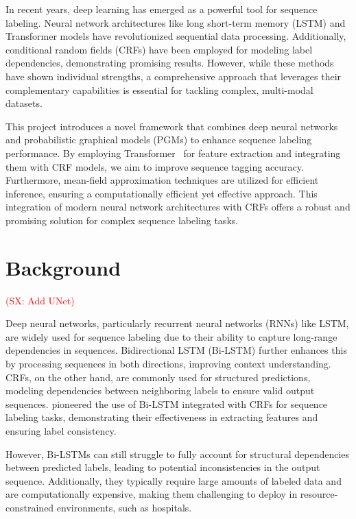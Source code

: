 \documentclass[conference]{IEEEtran}
\newcommand{\sx}[1]{\textcolor{red}{(SX: #1)}}
\begin{document}
In recent years, deep learning has emerged as a powerful tool for sequence
labeling. Neural network architectures like long short-term memory (LSTM) and
Transformer models have revolutionized sequential data processing.
Additionally, conditional random fields (CRFs) have been employed for modeling
label dependencies, demonstrating promising results.
However, while these methods have shown individual strengths, a comprehensive
approach that leverages their complementary capabilities is essential for
tackling complex, multi-modal datasets.


This project introduces a novel framework that combines deep neural networks
and probabilistic graphical models (PGMs) to enhance sequence labeling
performance. By employing Transformer~\citep{vaswani2017attention} for feature
extraction and integrating them with CRF models,
we aim to improve sequence tagging accuracy. Furthermore, mean-field
approximation techniques are utilized for efficient inference, ensuring a
computationally efficient yet effective approach.
This integration of modern neural network architectures with CRFs offers
a robust and promising solution for complex sequence labeling tasks.


\section{Background}

\sx{Add UNet}

Deep neural networks, particularly recurrent neural networks (RNNs) like LSTM,
are widely used for sequence labeling due to their ability to capture
long-range dependencies in sequences. Bidirectional LSTM (Bi-LSTM) further
enhances this by processing sequences in both directions, improving context
understanding.
CRFs, on the other hand, are commonly used for structured predictions,
modeling dependencies between neighboring labels to ensure valid output
sequences.
\citet{huang2015bidirectional} pioneered the use of Bi-LSTM integrated with
CRFs for sequence labeling tasks, demonstrating their effectiveness in
extracting features and ensuring label consistency.


However, Bi-LSTMs can still struggle to fully account for structural
dependencies between predicted labels, leading to potential inconsistencies in
the output sequence. Additionally, they typically require large amounts of
labeled data and are computationally expensive, making them challenging to
deploy in resource-constrained environments, such as hospitals.
\end{document}
